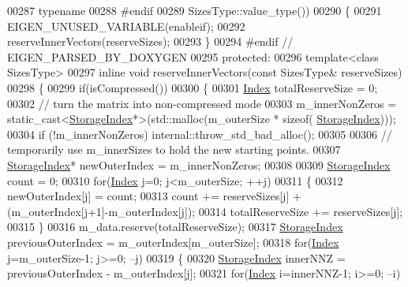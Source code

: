 \begin{DoxyCode}
00287         \textcolor{keyword}{typename}
00288     #endif
00289         SizesType::value\_type())
00290     \{
00291       EIGEN\_UNUSED\_VARIABLE(enableif);
00292       reserveInnerVectors(reserveSizes);
00293     \}
00294 \textcolor{preprocessor}{    #endif // EIGEN\_PARSED\_BY\_DOXYGEN}
00295   \textcolor{keyword}{protected}:
00296     \textcolor{keyword}{template}<\textcolor{keyword}{class} SizesType>
00297     \textcolor{keyword}{inline} \textcolor{keywordtype}{void} reserveInnerVectors(\textcolor{keyword}{const} SizesType& reserveSizes)
00298     \{
00299       \textcolor{keywordflow}{if}(isCompressed())
00300       \{
00301         \hyperlink{group___core___module_a554f30542cc2316add4b1ea0a492ff02}{Index} totalReserveSize = 0;
00302         \textcolor{comment}{// turn the matrix into non-compressed mode}
00303         m\_innerNonZeros = \textcolor{keyword}{static\_cast<}\hyperlink{group___sparse_core___module_a0b540ba724726ebe953f8c0df06081ed}{StorageIndex}*\textcolor{keyword}{>}(std::malloc(m\_outerSize * \textcolor{keyword}{sizeof}(
      \hyperlink{group___sparse_core___module_a0b540ba724726ebe953f8c0df06081ed}{StorageIndex})));
00304         \textcolor{keywordflow}{if} (!m\_innerNonZeros) internal::throw\_std\_bad\_alloc();
00305         
00306         \textcolor{comment}{// temporarily use m\_innerSizes to hold the new starting points.}
00307         \hyperlink{group___sparse_core___module_a0b540ba724726ebe953f8c0df06081ed}{StorageIndex}* newOuterIndex = m\_innerNonZeros;
00308         
00309         \hyperlink{group___sparse_core___module_a0b540ba724726ebe953f8c0df06081ed}{StorageIndex} count = 0;
00310         \textcolor{keywordflow}{for}(\hyperlink{group___core___module_a554f30542cc2316add4b1ea0a492ff02}{Index} j=0; j<m\_outerSize; ++j)
00311         \{
00312           newOuterIndex[j] = count;
00313           count += reserveSizes[j] + (m\_outerIndex[j+1]-m\_outerIndex[j]);
00314           totalReserveSize += reserveSizes[j];
00315         \}
00316         m\_data.reserve(totalReserveSize);
00317         \hyperlink{group___sparse_core___module_a0b540ba724726ebe953f8c0df06081ed}{StorageIndex} previousOuterIndex = m\_outerIndex[m\_outerSize];
00318         \textcolor{keywordflow}{for}(\hyperlink{group___core___module_a554f30542cc2316add4b1ea0a492ff02}{Index} j=m\_outerSize-1; j>=0; --j)
00319         \{
00320           \hyperlink{group___sparse_core___module_a0b540ba724726ebe953f8c0df06081ed}{StorageIndex} innerNNZ = previousOuterIndex - m\_outerIndex[j];
00321           \textcolor{keywordflow}{for}(\hyperlink{group___core___module_a554f30542cc2316add4b1ea0a492ff02}{Index} i=innerNNZ-1; i>=0; --i)

\end{DoxyCode}
